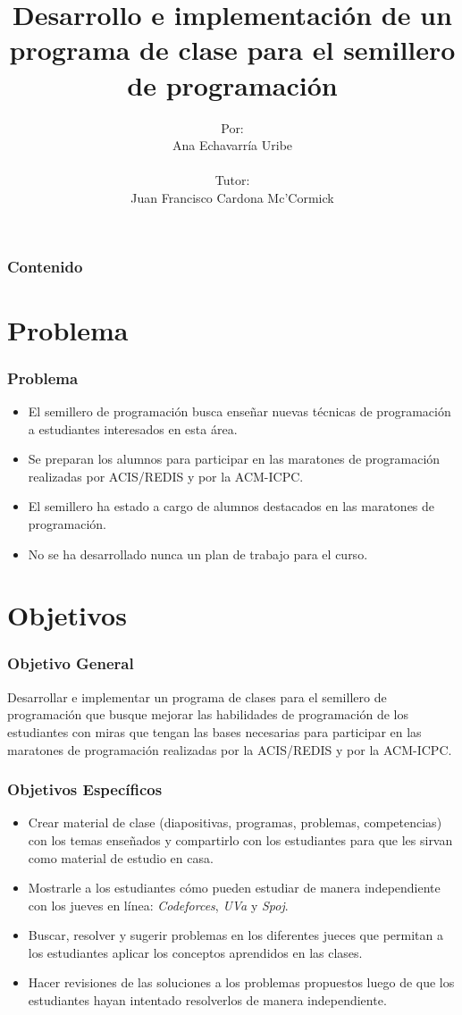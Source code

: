 \documentclass{beamer}
\title{Desarrollo e implementación de un programa de clase para el semillero de programación}
\author{Por: \\ Ana Echavarría Uribe \\ \quad \\ Tutor: \\ Juan Francisco Cardona Mc'Cormick}
\institute{Universidad EAFIT}
\date{}
\begin{document}
\begin{frame}
	\titlepage
\end{frame}

\begin{frame}
	\frametitle{Contenido}
	\tableofcontents
\end{frame}

\section{Problema}
	\begin{frame}
		\frametitle{Problema}
		\begin{itemize}
			\item El semillero de programación busca enseñar nuevas técnicas de programación a estudiantes interesados en esta área.
			\item Se preparan los alumnos para participar en las maratones de programación realizadas por ACIS/REDIS y por la ACM-ICPC.
			\item El semillero ha estado a cargo de alumnos destacados en las maratones de programación.
			\item No se ha desarrollado nunca un plan de trabajo para el curso.
		\end{itemize}		
	\end{frame}
	
\section{Objetivos}
	\begin{frame}
		\frametitle{Objetivo General}
		\begin{block}{}
			Desarrollar e implementar un programa de clases para el semillero de programación que busque mejorar las habilidades de programación de los estudiantes con miras que tengan las bases necesarias para participar en las maratones de programación realizadas por la ACIS/REDIS y por la ACM-ICPC.
		\end{block}
	\end{frame}
	
	\begin{frame}
		\frametitle{Objetivos Específicos}
		\begin{itemize}
			\item{Crear material de clase (diapositivas, programas, problemas, competencias) con los temas enseñados y compartirlo con los estudiantes para que les sirvan como material de estudio en casa.}
			\item{Mostrarle a los estudiantes cómo pueden estudiar de manera independiente con los jueves en línea: \emph{Codeforces}, \emph{UVa} y \emph{Spoj}.}
			\item{Buscar, resolver y sugerir problemas en los diferentes jueces que permitan a los estudiantes aplicar los conceptos aprendidos en las clases.}
			\item{Hacer revisiones de las soluciones a los problemas propuestos luego de que los estudiantes hayan intentado resolverlos de manera independiente.}
		\end{itemize}
	\end{frame}
	
\end{document}
